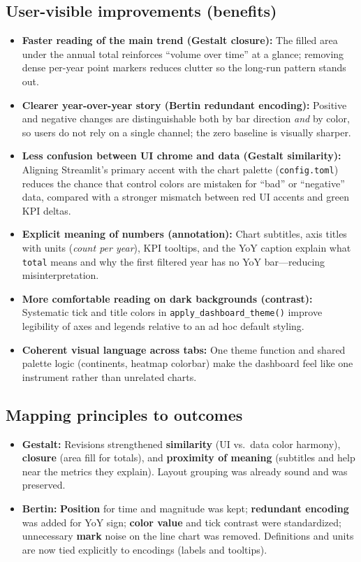 \documentclass[11pt,a4paper]{article}
\begin{document}
\subsection{User-visible improvements (benefits)}
\begin{itemize}[leftmargin=*]
  \item \textbf{Faster reading of the main trend (Gestalt closure):} The filled area under the annual total reinforces ``volume over time'' at a glance; removing dense per-year point markers reduces clutter so the long-run pattern stands out.
  \item \textbf{Clearer year-over-year story (Bertin redundant encoding):} Positive and negative changes are distinguishable both by bar direction \emph{and} by color, so users do not rely on a single channel; the zero baseline is visually sharper.
  \item \textbf{Less confusion between UI chrome and data (Gestalt similarity):} Aligning Streamlit's primary accent with the chart palette (\texttt{config.toml}) reduces the chance that control colors are mistaken for ``bad'' or ``negative'' data, compared with a stronger mismatch between red UI accents and green KPI deltas.
  \item \textbf{Explicit meaning of numbers (annotation):} Chart subtitles, axis titles with units (\emph{count per year}), KPI tooltips, and the YoY caption explain what \texttt{total} means and why the first filtered year has no YoY bar---reducing misinterpretation.
  \item \textbf{More comfortable reading on dark backgrounds (contrast):} Systematic tick and title colors in \texttt{apply\_dashboard\_theme()} improve legibility of axes and legends relative to an ad hoc default styling.
  \item \textbf{Coherent visual language across tabs:} One theme function and shared palette logic (continents, heatmap colorbar) make the dashboard feel like one instrument rather than unrelated charts.
\end{itemize}

\subsection{Mapping principles to outcomes}
\begin{itemize}[leftmargin=*]
  \item \textbf{Gestalt:} Revisions strengthened \textbf{similarity} (UI vs.\ data color harmony), \textbf{closure} (area fill for totals), and \textbf{proximity of meaning} (subtitles and help near the metrics they explain). Layout grouping was already sound and was preserved.
  \item \textbf{Bertin:} \textbf{Position} for time and magnitude was kept; \textbf{redundant encoding} was added for YoY sign; \textbf{color value} and tick contrast were standardized; unnecessary \textbf{mark} noise on the line chart was removed. Definitions and units are now tied explicitly to encodings (labels and tooltips).
\end{itemize}
\end{document}
